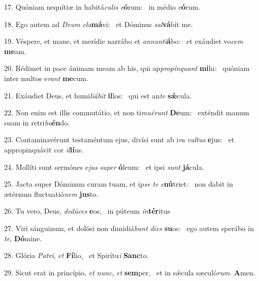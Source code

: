 17. Quóniam nequítiæ in habitá\textit{cu}\textit{lis} \textit{e}\textbf{ó}rum: \ast\  in médio \textit{e}\textbf{ó}rum.\

18. Ego autem ad \textit{De}\textit{um} \textit{cla}\textbf{má}vi: \ast\  et Dóminus \textit{sal}\textbf{vá}bit me.\

19. Véspere, et mane, et merídie narrábo et \textit{an}\textit{nun}\textit{ti}\textbf{á}bo: \ast\  et exáudiet vo\textit{cem} \textbf{me}am.\

20. Rédimet in pace ánimam meam ab his, qui ap\textit{pro}\textit{pín}\textit{quant} \textbf{mi}hi: \ast\  quóniam inter multos e\textit{rant} \textbf{me}cum.\

21. Exáudiet Deus, et humi\textit{li}\textit{á}\textit{bit} \textbf{il}los: \ast\  qui est an\textit{te} \textbf{sǽ}cula.\

22. Non enim est illis commutátio, et non ti\textit{mu}\textit{é}\textit{runt} \textbf{De}um: \ast\  exténdit manum suam in retri\textit{bu}\textbf{én}do.\

23. Contaminavérunt testaméntum ejus, divísi sunt ab i\textit{ra} \textit{vul}\textit{tus} \textbf{e}jus: \ast\  et appropinquávit cor \textit{il}\textbf{lí}us.\

24. Mollíti sunt sermónes e\textit{jus} \textit{su}\textit{per} \textbf{ó}leum: \ast\  et ipsi \textit{sunt} \textbf{já}cula.\

25. Jacta super Dóminum curam tuam, et ip\textit{se} \textit{te} \textit{e}\textbf{nú}triet: \ast\  non dabit in ætérnum fluctuatió\textit{nem} \textbf{jus}to.\

26. Tu vero, Deus, \textit{de}\textit{dú}\textit{ces} \textbf{e}os, \ast\  in púteum \textit{in}\textbf{tér}itus\

27. Viri sánguinum, et dolósi non dimidiá\textit{bunt} \textit{di}\textit{es} \textbf{su}os: \ast\  ego autem sperábo in \textit{te}, \textbf{Dó}mine.\

28. Glória \textit{Pa}\textit{tri}, \textit{et} \textbf{Fí}lio, \ast\  et Spirítu\textit{i} \textbf{Sanc}to.\

29. Sicut erat in princípio, \textit{et} \textit{nunc}, \textit{et} \textbf{sem}per, \ast\  et in sǽcula sæculó\textit{rum}. \textbf{A}men.\

